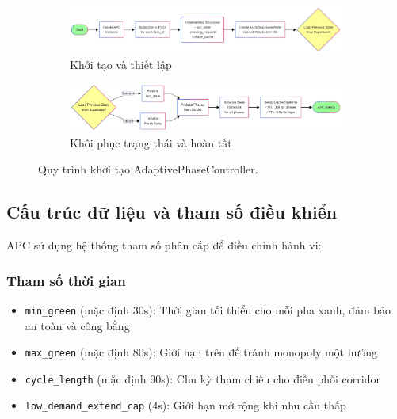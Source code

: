 \documentclass[12pt,a4paper,oneside]{report}
\begin{document}
\begin{figure}[H]
    \centering
    \begin{subfigure}[b]{0.65\textwidth}
        \centering
        \includegraphics[width=1.1\textwidth]{Untitled diagram _ Mermaid Chart-2025-08-21-084042.png}
        \caption{Khởi tạo và thiết lập}
    \end{subfigure}
    \hfill
    \begin{subfigure}[b]{0.65\textwidth}
        \centering
        \includegraphics[width=1.1\textwidth]{Untitled diagram _ Mermaid Chart-2025-08-21-084132.png}
        \caption{Khôi phục trạng thái và hoàn tất}
    \end{subfigure}
    \caption{Quy trình khởi tạo AdaptivePhaseController.}
    \label{fig:apc_init_flow}
\end{figure}
\subsection{Cấu trúc dữ liệu và tham số điều khiển}

APC sử dụng hệ thống tham số phân cấp để điều chỉnh hành vi:

\subsubsection{Tham số thời gian}
\begin{itemize}
    \item \texttt{min\_green} (mặc định 30s): Thời gian tối thiểu cho mỗi pha xanh, đảm bảo an toàn và công bằng
    \item \texttt{max\_green} (mặc định 80s): Giới hạn trên để tránh monopoly một hướng
    \item \texttt{cycle\_length} (mặc định 90s): Chu kỳ tham chiếu cho điều phối corridor
    \item \texttt{low\_demand\_extend\_cap} (4s): Giới hạn mở rộng khi nhu cầu thấp
\end{itemize}
\end{document}
